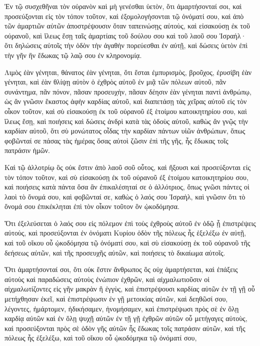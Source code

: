 {\par }{\PP {}Ἐν τῷ συσχεθῆναι τὸν οὐρανὸν καὶ μὴ γενέσθαι ὑετὸν, ὅτι ἁμαρτήσονταί σοι, καὶ προσεύξονται εἰς τὸν τόπον τοῦτον, καὶ ἐξομολογήσονται τῷ ὀνόματί σου, καὶ ἀπὸ τῶν ἁμαρτιῶν αὐτῶν ἀποστρέψουσιν ὅταν ταπεινώσῃς αὐτοὺς,
καὶ εἰσακούσῃ ἐκ τοῦ οὐρανοῦ, καὶ ἵλεως ἔσῃ ταῖς ἁμαρτίαις τοῦ δούλου σου καὶ τοῦ λαοῦ σου Ἰσραήλ· ὅτι δηλώσεις αὐτοῖς τὴν ὁδὸν τὴν ἀγαθὴν πορεύεσθαι ἐν αὐτῇ, καὶ δώσεις ὑετὸν ἐπὶ τὴν γῆν ἣν ἔδωκας τῷ λαῷ σου ἐν κληρονομίᾳ.
\par }{\PP {}Λιμὸς ἐὰν γένηται, θάνατος ἐὰν γένηται, ὅτι ἔσται ἐμπυρισμὸς, βροῦχος, ἐρυσίβη ἐὰν γένηται, καὶ ἐὰν θλίψῃ αὐτὸν ὁ ἐχθρὸς αὐτοῦ ἐν μιᾷ τῶν πόλεων αὐτοῦ, πᾶν συνάντημα, πᾶν πόνον,
πᾶσαν προσευχὴν, πᾶσαν δέησιν ἐὰν γένηται παντὶ ἀνθρώπῳ, ὡς ἂν γνῶσιν ἕκαστος ἁφὴν καρδίας αὐτοῦ, καὶ διαπετάσῃ τὰς χεῖρας αὐτοῦ εἰς τὸν οἶκον τοῦτον,
καὶ σὺ εἰσακούσῃ ἐκ τοῦ οὐρανοῦ ἐξ ἑτοίμου κατοικητηρίου σου, καὶ ἵλεως ἔσῃ, καὶ ποιήσεις καὶ δώσεις ἀνδρὶ κατὰ τὰς ὁδοὺς αὐτοῦ, καθὼς ἂν γνῷς τὴν καρδίαν αὐτοῦ, ὅτι σὺ μονώτατος οἶδας τὴν καρδίαν πάντων υἱῶν ἀνθρώπων,
ὅπως φοβῶνταί σε πάσας τὰς ἡμέρας ὅσας αὐτοὶ ζῶσιν ἐπὶ τῆς γῆς, ἧς ἔδωκας τοῖς πατράσιν ἡμῶν.
\par }{\PP {}Καὶ τῷ ἀλλοτρίῳ ὃς οὐκ ἔστιν ἀπὸ λαοῦ σοῦ οὗτος,
καὶ ἥξουσι καὶ προσεύξονται εἰς τὸν τόπον τοῦτον,
καὶ σὺ εἰσακούσῃ ἐκ τοῦ οὐρανοῦ ἐξ ἑτοίμου κατοικητηρίου σου, καὶ ποιήσεις κατὰ πάντα ὅσα ἂν ἐπικαλέσηταί σε ὁ ἀλλότριος, ὅπως γνῶσι πάντες οἱ λαοὶ τὸ ὄνομά σου, καὶ φοβῶνταί σε, καθὼς ὁ λαός σου Ἰσραὴλ, καὶ γνῶσιν ὅτι τὸ ὄνομά σου ἐπικέκληται ἐπὶ τὸν οἶκον τοῦτον ὃν ᾠκοδόμησα.
\par }{\PP {}Ὅτι ἐξελεύσεται ὁ λαός σου εἰς πόλεμον ἐπὶ τοὺς ἐχθροὺς αὐτοῦ ἐν ὁδῷ ᾗ ἐπιστρέψεις αὐτοὺς, καὶ προσεύξονται ἐν ὀνόματι Κυρίου ὁδὸν τῆς πόλεως ἧς ἑξελέξω ἐν αὐτῇ, καὶ τοῦ οἴκου οὗ ᾠκοδόμησα τῷ ὀνόματί σου,
καὶ σὺ εἰσακούσῃ ἐκ τοῦ οὐρανοῦ τῆς δεήσεως αὐτῶν, καὶ τῆς προσευχῆς αὐτῶν, καὶ ποιήσεις τὸ δικαίωμα αὐτοῖς.
\par }{\PP {}Ὅτι ἁμαρτήσονταί σοι, ὅτι οὐκ ἔστιν ἄνθρωπος ὃς οὐχ ἁμαρτήσεται, καὶ ἐπάξεις αὐτοὺς καὶ παραδώσεις αὐτοὺς ἐνώπιον ἐχθρῶν, καὶ αἰχμαλωτιοῦσιν οἱ αἰχμαλωτίζοντες εἰς γῆν μακρὰν ἢ ἐγγὺς,
καὶ ἐπιστρέψουσι καρδίας αὐτῶν ἐν τῇ γῇ οὗ μετήχθησαν ἐκεῖ, καὶ ἐπιστρέψωσιν ἐν γῇ μετοικίας αὐτῶν, καὶ δεηθῶσί σου, λέγοντες, ἡμάρτομεν, ἠδικήσαμεν, ἠνομήσαμεν,
καὶ ἐπιστρέψωσι πρὸς σὲ ἐν ὅλῃ καρδίᾳ αὐτῶν καὶ ἐν ὅλῃ ψυχῇ αὐτῶν ἐν τῇ γῇ ἐχθρῶν αὐτῶν οὗ μετήγαγες αὐτοὺς, καὶ προσεύξονται πρὸς σὲ ὁδὸν γῆς αὐτῶν ἧς ἔδωκας τοῖς πατράσιν αὐτῶν, καὶ τῆς πόλεως ἧς ἐξελέξω, καὶ τοῦ οἴκου οὗ ᾠκοδόμηκα τῷ ὀνόματί σου,
}
